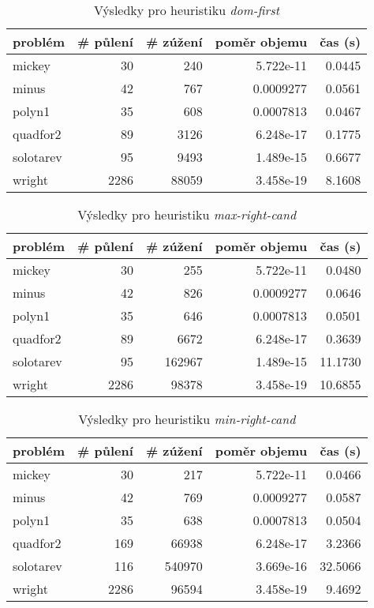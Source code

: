 {\begin{table}[H]
\centering
\begin{tabular}{lrrrr}
\hline
problém & \# půlení & \# zúžení & poměr objemu & čas (s) \\ \hline
mickey & 30 & 240 & 5.722e-11 & 0.0445 \\
minus & 42 & 767 & 0.0009277 & 0.0561 \\
polyn1 & 35 & 608 & 0.0007813 & 0.0467 \\
quadfor2 & 89 & 3126 & 6.248e-17 & 0.1775 \\
solotarev & 95 & 9493 & 1.489e-15 & 0.6677 \\
wright & 2286 & 88059 & 3.458e-19 & 8.1608 \\
\end{tabular}
\caption{Výsledky pro heuristiku \emph{dom-first}}
\label{dom-first}
\end{table}



\begin{table}[H]
\centering
\begin{tabular}{lrrrr}
\hline
problém & \# půlení & \# zúžení & poměr objemu & čas (s) \\ \hline
mickey & 30 & 255 & 5.722e-11 & 0.0480 \\
minus & 42 & 826 & 0.0009277 & 0.0646 \\
polyn1 & 35 & 646 & 0.0007813 & 0.0501 \\
quadfor2 & 89 & 6672 & 6.248e-17 & 0.3639 \\
solotarev & 95 & 162967 & 1.489e-15 & 11.1730 \\
wright & 2286 & 98378 & 3.458e-19 & 10.6855 \\
\end{tabular}
\caption{Výsledky pro heuristiku \emph{max-right-cand}}
\label{max-right-cand}
\end{table}



\begin{table}[H]
\centering
\begin{tabular}{lrrrr}
\hline
problém & \# půlení & \# zúžení & poměr objemu & čas (s) \\ \hline
mickey & 30 & 217 & 5.722e-11 & 0.0466 \\
minus & 42 & 769 & 0.0009277 & 0.0587 \\
polyn1 & 35 & 638 & 0.0007813 & 0.0504 \\
quadfor2 & 169 & 66938 & 6.248e-17 & 3.2366 \\
solotarev & 116 & 540970 & 3.669e-16 & 32.5066 \\
wright & 2286 & 96594 & 3.458e-19 & 9.4692 \\
\end{tabular}
\caption{Výsledky pro heuristiku \emph{min-right-cand}}
\label{min-right-cand}
\end{table}



}
